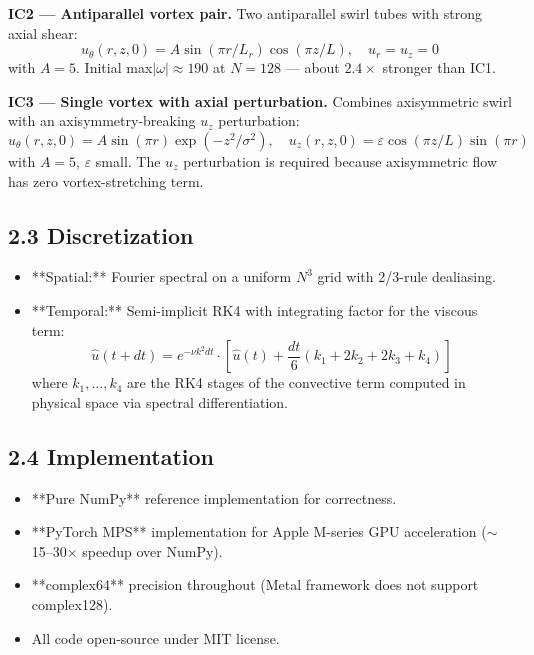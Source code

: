 \documentclass[11pt]{article}
\begin{document}
\textbf{IC2 — Antiparallel vortex pair.} Two antiparallel swirl tubes with
strong axial shear:
\begin{equation*}u_\theta(r, z, 0) = A \sin(\pi r / L_r) \cos(\pi z / L), \quad u_r = u_z = 0\end{equation*}
with \(A = 5\). Initial max\(|\omega| \approx 190\) at \(N = 128\) — about
\(2.4 \times\) stronger than IC1.

\textbf{IC3 — Single vortex with axial perturbation.} Combines axisymmetric
swirl with an axisymmetry-breaking \(u_z\) perturbation:
\begin{equation*}
u_\theta(r, z, 0) = A \sin(\pi r) \exp(-z^2 / \sigma^2), \quad
u_z(r, z, 0) = \varepsilon \cos(\pi z / L) \sin(\pi r)
\end{equation*}
with \(A = 5\), \(\varepsilon\) small. The \(u_z\) perturbation is required
because axisymmetric flow has zero vortex-stretching term.


\subsection*{2.3 Discretization}

\begin{itemize}
\item **Spatial:** Fourier spectral on a uniform $N^3$ grid with 2/3-rule
  dealiasing.
\item **Temporal:** Semi-implicit RK4 with integrating factor for the viscous
  term:
\begin{equation*}
\hat u(t + dt) = e^{-\nu k^2 dt} \cdot \left[\hat u(t) +
  \frac{dt}{6}(k_1 + 2k_2 + 2k_3 + k_4)\right]
\end{equation*}
  where \(k_1, \ldots, k_4\) are the RK4 stages of the convective term
  computed in physical space via spectral differentiation.
\end{itemize}


\subsection*{2.4 Implementation}

\begin{itemize}
\item **Pure NumPy** reference implementation for correctness.
\item **PyTorch MPS** implementation for Apple M-series GPU acceleration
  (\(\sim\)15–30× speedup over NumPy).
\item **complex64** precision throughout (Metal framework does not support
  complex128).
\item All code open-source under MIT license.
\end{itemize}
\end{document}
